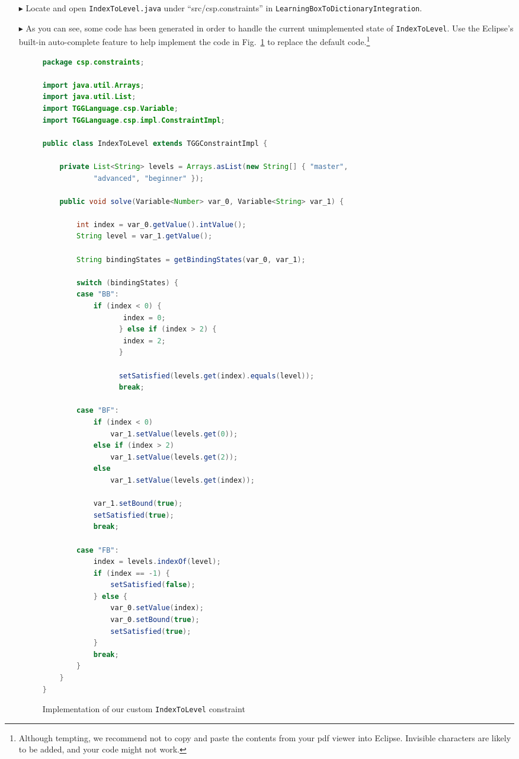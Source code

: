 \begin{itemize}
\item[$\blacktriangleright$] Locate and open \texttt{IndexToLevel.java} under ``src/csp.constraints'' in \texttt{LearningBoxToDictionaryIntegration}.

\item[$\blacktriangleright$] As you can see, some code has been generated in order to handle the current unimplemented state of \texttt{IndexToLevel}. Use the
Eclipse's built-in auto-complete feature to help implement the code in Fig.~\ref{code:indexToLevel} to replace the default code.\footnote{Although tempting, we
recommend not to copy and paste the contents from your pdf viewer into Eclipse. Invisible characters are likely to be added, and your code might not work.}

\begin{figure}[htbp]
\begin{center}
\begin{lstlisting}[language=Java,backgroundcolor=\color{white}, keywordstyle={\bfseries\color{purple}}]
package csp.constraints;

import java.util.Arrays;
import java.util.List;
import TGGLanguage.csp.Variable;
import TGGLanguage.csp.impl.ConstraintImpl;

public class IndexToLevel extends TGGConstraintImpl {

	private List<String> levels = Arrays.asList(new String[] { "master",
			"advanced", "beginner" });

	public void solve(Variable<Number> var_0, Variable<String> var_1) {

		int index = var_0.getValue().intValue();
		String level = var_1.getValue();

		String bindingStates = getBindingStates(var_0, var_1);
		
		switch (bindingStates) {
		case "BB":
			if (index < 0) {
    		       index = 0;
    		      } else if (index > 2) {
    		       index = 2;
    		      } 
    		      
    		      setSatisfied(levels.get(index).equals(level));
    		      break;

		case "BF":
			if (index < 0)
				var_1.setValue(levels.get(0));
			else if (index > 2)
				var_1.setValue(levels.get(2));
			else
				var_1.setValue(levels.get(index));

			var_1.setBound(true);
			setSatisfied(true);
			break;

		case "FB":
			index = levels.indexOf(level);
			if (index == -1) {
				setSatisfied(false);
			} else {
				var_0.setValue(index);
				var_0.setBound(true);
				setSatisfied(true);
			}
			break;
		}
	}
}
\end{lstlisting}
  \caption{Implementation of our custom \texttt{IndexToLevel} constraint}
  \label{code:indexToLevel}
\end{center}
\end{figure}

\end{itemize}

